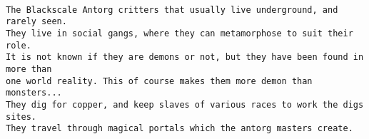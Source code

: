 \




\pagebreak[4]
\tiny \begin{samepage} \begin{verbatim}
The Blackscale Antorg critters that usually live underground, and rarely seen.
They live in social gangs, where they can metamorphose to suit their role.
It is not known if they are demons or not, but they have been found in more than
one world reality. This of course makes them more demon than monsters...
They dig for copper, and keep slaves of various races to work the digs sites.
They travel through magical portals which the antorg masters create.


\end{verbatim}
\end{samepage}
